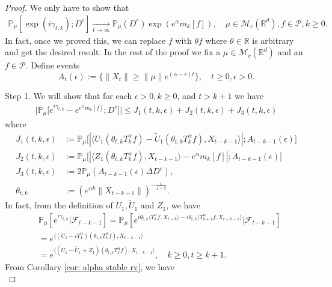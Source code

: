 \documentclass[12pt]{amsart}
\theoremstyle{plain}
\theoremstyle{definition}
\numberwithin{equation}{section}
\begin{document}
 \begin{proof}
	We only have to show that
\begin{align}
    \mathbb{P}_{\mu}[\exp(i\gamma_{t,k}); D^c]
    \xrightarrow[t\rightarrow \infty]{}\mathbb{P}_{\mu}(D^c)\exp(e^{\alpha}m_k[f]),
    \quad \mu \in \mathcal M_c(\mathbb R^d), f\in \mathcal P, k \geq 0.
\end{align}
	In fact, once we proved this, we can replace $f$ with $\theta f$ where $\theta \in \mathbb R$ is arbitrary and get the desired result.
	In the rest of the proof we fix a $\mu \in \mathcal M_c(\mathbb R^d)$ and an $f\in \mathcal P$.
	Define events
\[
	A_t(\epsilon):=\{ \|X_t\| \geq \|\mu\|e^{(\alpha - \epsilon)t} \},\quad t\geq 0, \epsilon > 0.
\]
	
	Step 1. We will show that for each $\epsilon > 0, k\geq 0$, and $t>k+1$ we have
\begin{align}
    \big|\mathbb{P}_{\mu}\big[e^{i\gamma_{t,k}}-e^{e^{\alpha}m_k[f]}; D^c\big]\big|
    \leq J_1(t,k,\epsilon)+J_2(t,k,\epsilon)+J_3(t,k,\epsilon)
\end{align}
	where
\begin{align}
\label{eq: Def of Ji}
	J_1(t,k,\epsilon)
	&:= \mathbb{P}_{\mu}\big[|\langle U_1(\theta_{t,k}T_k^{\alpha}f)-\tilde U_1(\theta_{t,k}T_k^{\alpha}f), X_{t-k-1}\rangle|; A_{t-k-1}(\epsilon) \big]
	\\ J_2(t,k,\epsilon)
	&:= \mathbb{P}_{\mu}\big[|\langle Z_1(\theta_{t,k}T_k^{\alpha}f),X_{t-k-1}\rangle-e^{\alpha}m_k[f]|; A_{t-k-1}(\epsilon)\big]
	\\ J_3(t,k, \epsilon)
	&:=2\mathbb{P}_{\mu}(A_{t-k-1}(\epsilon)\Delta D^c),
	\\\theta_{t,k}
	&:= (e^{\alpha k}\|X_{t-k-1}\|)^{-\frac{1}{1+\beta}}.
\end{align}
In fact, from the definition of $U_1, \tilde U_1$ and $Z_1$, we have
\begin{align}
\label{eq: need1}
    &\mathbb{P}_{\mu}[e^{i\gamma_{t,k}}|\mathscr{F}_{t-k-1}]
    =\mathbb{P}_{\mu}[e^{i\theta_{t,k}\langle T_k^{\alpha}f,X_{t-k}\rangle-i\theta_{t,k}\langle T_{k+1}^{\alpha}f, X_{t-k-1}\rangle}|\mathscr{F}_{t-k-1}]
    \\&=e^{\langle (U_1 - iT_{1}^{\alpha}) (\theta_{t,k}T_k^{\alpha}f),X_{t-k-1}\rangle}
    \\&=e^{\langle (U_1 - \tilde U_1+Z_1) (\theta_{t,k}T_k^{\alpha}f),X_{t-k-1}\rangle},
    \quad k\geq 0, t\geq k+1.
\end{align}
	From Corollary \ref{cor: alpha stable rv}, we have
\begin{equation}

\end{equation}
\end{proof}
\end{document}
